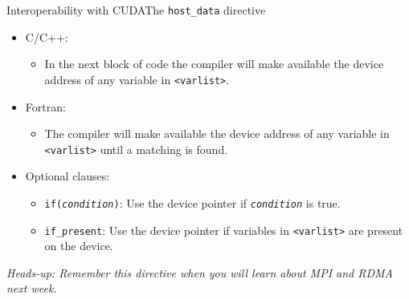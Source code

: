 \documentclass[12pt,aspectratio=169]{beamer}
\begin{document}
\begin{frame}[fragile]{Interoperability with CUDA}{The \texttt{host\_data} directive}
  \begin{itemize}
  \item C/C++: 
    \begin{itemize}
    \item In the next block of code the compiler will make available the device address of any variable in \texttt{<varlist>}.
    \end{itemize}
  \item Fortran: 
    \begin{itemize}
    \item The compiler will make available the device address of any variable in \texttt{<varlist>} until a matching  is found.
    \end{itemize}
  \item Optional clauses:
    \begin{itemize}
    \item \texttt{if(\emph{condition})}: Use the device pointer if \texttt{\emph{condition}} is true.
    \item \texttt{if\_present}: Use the device pointer if variables in \texttt{<varlist>} are present on the device.
    \end{itemize}
  \end{itemize}
  \small\emph{Heads-up: Remember this directive when you will learn about MPI and RDMA next week.}
\end{frame}



\end{document}
